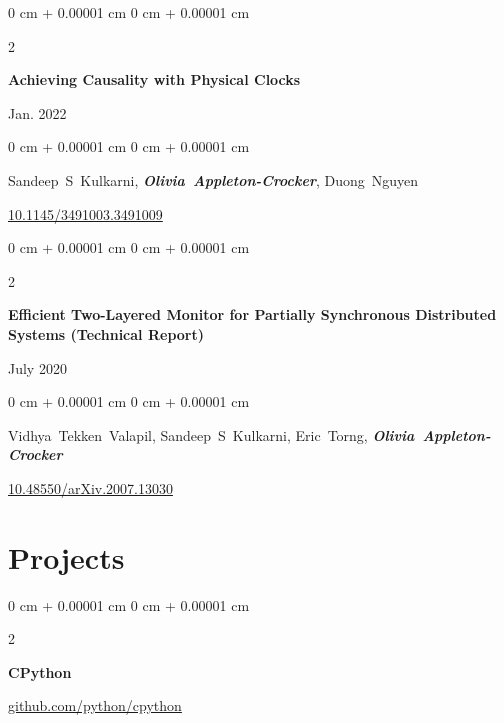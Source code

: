 \documentclass[10pt, letterpaper]{article}
\newenvironment{onecolentry}{
    \begin{adjustwidth}{
        0 cm + 0.00001 cm
    }{
        0 cm + 0.00001 cm
    }
}{
    \end{adjustwidth}
} %
\newenvironment{twocolentry}[2][]{
    \onecolentry
    \def\secondColumn{#2}
    \setcolumnwidth{\fill, 4.5 cm}
    \begin{paracol}{2}
}{
    \switchcolumn \raggedleft \secondColumn
    \end{paracol}
    \endonecolentry
} %
\begin{document}
        \begin{samepage}
            \begin{twocolentry}{
                Jan. 2022
            }
                \textbf{Achieving Causality with Physical Clocks}
            \end{twocolentry}

            \vspace{0.10 cm}
            
            \begin{onecolentry}
                \mbox{Sandeep S Kulkarni}, \mbox{\textbf{\textit{Olivia Appleton-Crocker}}}, \mbox{Duong Nguyen}

                \vspace{0.10 cm}
                
        \href{https://doi.org/10.1145/3491003.3491009}{10.1145/3491003.3491009}
        \end{onecolentry}
        \end{samepage}

        \begin{samepage}
            \begin{twocolentry}{
                July 2020
            }
                \textbf{Efficient Two-Layered Monitor for Partially Synchronous Distributed Systems (Technical Report)}
            \end{twocolentry}

            \vspace{0.10 cm}
            
            \begin{onecolentry}
                \mbox{Vidhya Tekken Valapil}, \mbox{Sandeep S Kulkarni}, \mbox{Eric Torng}, \mbox{\textbf{\textit{Olivia Appleton-Crocker}}}

                \vspace{0.10 cm}
                
        \href{https://doi.org/10.48550/arXiv.2007.13030}{10.48550/arXiv.2007.13030}
        \end{onecolentry}
        \end{samepage}

    \vspace{-5pt}
    
    \section{Projects}
        
        \begin{twocolentry}{
            \href{https://github.com/python/cpython}{github.com/python/cpython}
        }
            \textbf{CPython}
        \end{twocolentry}
\end{document}

